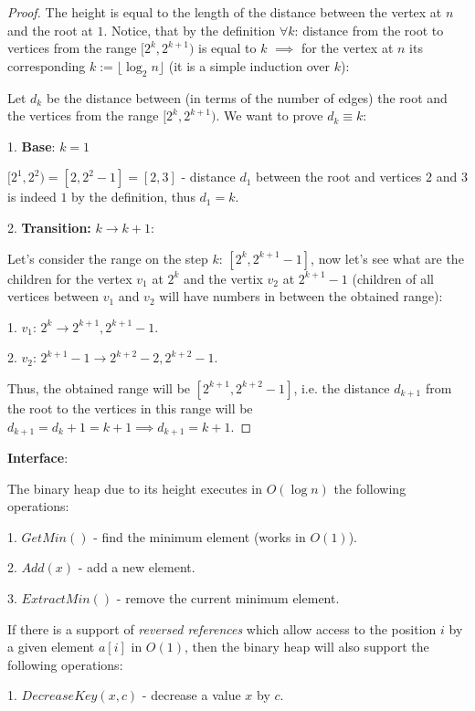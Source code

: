 \begin{proof}

    The height is equal to the length of the distance between the vertex at $n$ and the root at $1$. Notice, that by the definition $\forall k$: distance from the root to vertices from the range $[2^k, 2^{k+1})$ is equal to $k$ $\implies$ for the vertex at $n$ its corresponding $k := \lfloor \log_{2}{n} \rfloor$ (it is a simple induction over $k$):

    Let $d_{k}$ be the distance between (in terms of the number of edges) the root and the vertices from the range $[2^k, 2^{k+1})$. We want to prove $d_{k} \equiv k$:

    1. \textbf{Base}: $k=1$

    $[2^1, 2^{2}) = [2, 2^2-1] = [2, 3]$ - distance $d_{1}$ between the root and vertices $2$ and $3$ is indeed $1$ by the definition, thus $d_{1} = k$.

    2. \textbf{Transition:} $k \to k+1$:

    Let's consider the range on the step $k$: $[2^k, 2^{k+1}-1]$, now let's see what are the children for the vertex $v_1$ at $2^k$ and the vertix $v_2$ at $2^{k+1}-1$ (children of all vertices between $v_1$ and $v_2$ will have numbers in between the obtained range):

        1. $v_1$: $2^k \to 2^{k+1}, 2^{k+1}-1$.

        2. $v_2$: $2^{k+1}-1 \to 2^{k+2}-2, 2^{k+2}-1$.

        Thus, the obtained range will be $[2^{k+1}, 2^{k+2}-1]$, i.e. the distance $d_{k+1}$ from the root to the vertices in this range will be $d_{k+1} = d_{k} + 1 = k+1 \implies d_{k+1} = k+1$.

\end{proof}

\textbf{Interface}:

The binary heap due to its height executes in $O(\log{n})$ the following operations:

1. $GetMin()$ - find the minimum element (works in $O(1)$).

2. $Add(x)$ - add a new element.

3. $ExtractMin()$ - remove the current minimum element.

If there is a support of \textit{reversed references} which allow access to the position $i$ by a given element $a[i]$ in $O(1)$, then the binary heap will also support the following operations:

1. $DecreaseKey(x, c)$ - decrease a value $x$ by $c$.


